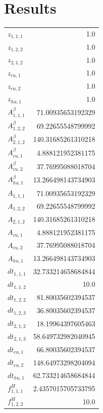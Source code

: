 \documentclass{article}%
\makeatletter
\let\mcnewpage=\newpage%
\newcommand{\TrickSupertabularIntoMulticols}{%
\renewcommand\newpage{%
\if@firstcolumn%
\hrule width\linewidth height0pt%
\columnbreak%
\else%
\mcnewpage%
\fi%
}%
}%
\makeatother
\begin{document}
\section{Results}%
\thispagestyle{plain}%
\begin{multicols*}{3}%
\TrickSupertabularIntoMulticols%
%
\begin{supertabular}{lr}%
	$z_{1,1,1}$ & 1.0 \\%
	$z_{1,2,2}$ & 1.0 \\%
	$z_{2,1,2}$ & 1.0 \\%
	$z_{cu,1}$ & 1.0 \\%
	$z_{cu,2}$ & 1.0 \\%
	$z_{hu,1}$ & 1.0 \\%
	$A_{1,1,1}^{\beta}$ & 71.00935653192329 \\%
	$A_{1,2,2}^{\beta}$ & 69.22655548799992 \\%
	$A_{2,1,2}^{\beta}$ & 140.31685261310218 \\%
	$A_{cu,1}^{\beta}$ & 4.888121952381175 \\%
	$A_{cu,2}^{\beta}$ & 37.76995088018704 \\%
	$A_{hu,1}^{\beta}$ & 13.266498143734903 \\%
	$A_{1,1,1}$ & 71.00935653192329 \\%
	$A_{1,2,2}$ & 69.22655548799992 \\%
	$A_{2,1,2}$ & 140.31685261310218 \\%
	$A_{cu,1}$ & 4.888121952381175 \\%
	$A_{cu,2}$ & 37.76995088018704 \\%
	$A_{hu,1}$ & 13.266498143734903 \\%
	$dt_{1,1,1}$ & 32.733214658684844 \\%
	$dt_{1,1,2}$ & 10.0 \\%
	$dt_{1,2,2}$ & 81.80035602394537 \\%
	$dt_{1,2,3}$ & 36.80035602394537 \\%
	$dt_{2,1,2}$ & 18.19964397605463 \\%
	$dt_{2,1,3}$ & 58.649732982040945 \\%
	$dt_{cu,1}$ & 66.80035602394537 \\%
	$dt_{cu,2}$ & 148.64973298204094 \\%
	$dt_{hu,1}$ & 62.733214658684844 \\%
	$f_{1,1,1}^{H}$ & 2.4357015705733795 \\%
	$f_{1,2,2}^{H}$ & 10.0 \\%

\end{supertabular}
\end{multicols*}
\end{document}
